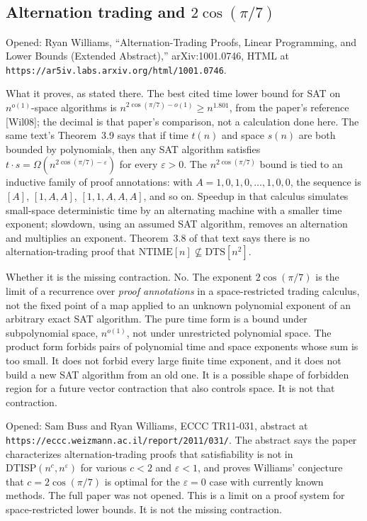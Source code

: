 \documentclass{article}
\begin{document}
\subsection{Alternation trading and \(2\cos(\pi/7)\)}
Opened: Ryan Williams, ``Alternation-Trading Proofs, Linear Programming, and Lower Bounds (Extended Abstract),'' arXiv:1001.0746, HTML at \texttt{https://ar5iv.labs.arxiv.org/html/1001.0746}.

What it proves, as stated there.
The best cited time lower bound for SAT on \(n^{o(1)}\)-space algorithms is \(n^{2\cos(\pi/7)-o(1)}\ge n^{1.801}\), from the paper's reference [Wil08]; the decimal is that paper's comparison, not a calculation done here.
The same text's Theorem~3.9 says that if time \(t(n)\) and space \(s(n)\) are both bounded by polynomials, then any SAT algorithm satisfies \(t\cdot s=\Omega(n^{2\cos(\pi/7)-\varepsilon})\) for every \(\varepsilon>0\).
The \(n^{2\cos(\pi/7)}\) bound is tied to an inductive family of proof annotations: with \(A=1,0,1,0,\ldots,1,0,0\), the sequence is \([A]\), \([1,A,A]\), \([1,1,A,A,A]\), and so on.
Speedup in that calculus simulates small-space deterministic time by an alternating machine with a smaller time exponent; slowdown, using an assumed SAT algorithm, removes an alternation and multiplies an exponent.
Theorem~3.8 of that text says there is no alternation-trading proof that \(\mathrm{NTIME}[n]\nsubseteq\mathrm{DTS}[n^2]\).

Whether it is the missing contraction.
No.
The exponent \(2\cos(\pi/7)\) is the limit of a recurrence over \emph{proof annotations} in a space-restricted trading calculus, not the fixed point of a map applied to an unknown polynomial exponent of an arbitrary exact SAT algorithm.
The pure time form is a bound under subpolynomial space, \(n^{o(1)}\), not under unrestricted polynomial space.
The product form forbids pairs of polynomial time and space exponents whose sum is too small.
It does not forbid every large finite time exponent, and it does not build a new SAT algorithm from an old one.
It is a possible shape of forbidden region for a future vector contraction that also controls space.
It is not that contraction.

Opened: Sam Buss and Ryan Williams, ECCC TR11-031, abstract at \texttt{https://eccc.weizmann.ac.il/report/2011/031/}.
The abstract says the paper characterizes alternation-trading proofs that satisfiability is not in \(\mathrm{DTISP}(n^c,n^\varepsilon)\) for various \(c<2\) and \(\varepsilon<1\), and proves Williams' conjecture that \(c=2\cos(\pi/7)\) is optimal for the \(\varepsilon=0\) case with currently known methods.
The full paper was not opened.
This is a limit on a proof system for space-restricted lower bounds.
It is not the missing contraction.
\end{document}
